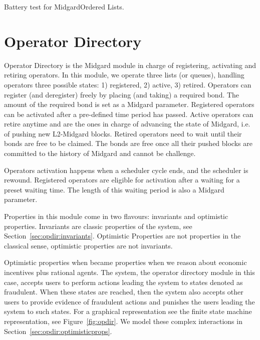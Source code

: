 \begin{theorem}
  \label{thm:Tests.ordered_list_tests}
  \leanok
  Battery test for MidgardOrdered Lists.
  \end{theorem}


\section{Operator Directory}

Operator Directory is the Midgard module in charge of registering, activating
and retiring operators.
%
In this module, we operate three lists (or queues), handling operators three
possible states: 1) registered, 2) active, 3) retired.
%
Operators can register (and deregister) freely by placing (and taking) a
required bond.
%
The amount of the required bond is set as a Midgard parameter.
%
Registered operators can be activated after a pre-defined time period has passed.
%
Active operators can retire anytime and are the ones in charge of advancing the
state of Midgard, i.e. of pushing new L2-Midgard blocks.
%
Retired operators need to wait until their bonds are free to be claimed.
%
The bonds are free once all their pushed blocks are committed to the history of
Midgard and cannot be challenge.

Operators activation happens when a scheduler cycle ends, and the scheduler is
rewound.
%
Registered operators are eligible for activation after a waiting for a preset
waiting time.
%
The length of this waiting period is also a Midgard parameter.
%

Properties in this module come in two flavours: invariants and optimistic properties.
%
Invariants are classic properties of the system, see Section~\ref{sec:opdir:invariants}.
%
Optimistic Properties are not properties in the classical sense, optimistic properties are not invariants.

Optimistic properties when became properties when we reason about economic
incentives plus rational agents.
%
The system, the operator directory module in this case, accepts users to perform
actions leading the system to states denoted as fraudulent.
%
When these states are reached, then the system also accepts other users to
provide evidence of fraudulent actions and punishes the users leading the system
to such states.
%
For a graphical representation see the finite state machine representation, see
Figure~\ref{fig:opdir}.
%
We model these complex interactions in Section~\ref{sec:opdir:optimisticprops}.

